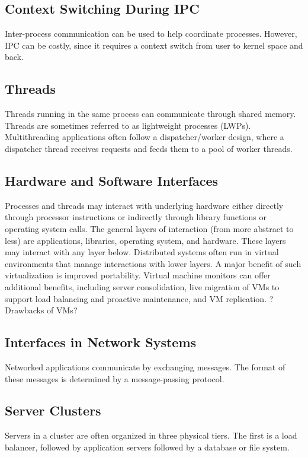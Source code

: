 \documentclass[12pt,titlepage]{article}
\begin{document}
    \subsection{Context Switching During IPC}
      Inter-process communication can be used to help coordinate processes. However, IPC can be costly, since it requires a context switch from user to
      kernel space and back.

    \subsection{Threads}
      Threads running in the same process can communicate through shared memory. Threads are sometimes referred to as lightweight processes (LWPs).
      Multithreading applications often follow a dispatcher/worker design, where a dispatcher thread receives requests and feeds them to a pool
      of worker threads.

    \subsection{Hardware and Software Interfaces}
      Processes and threads may interact with underlying hardware either directly through processor instructions or indirectly through library functions
      or operating system calls. The general layers of interaction (from more abstract to less) are applications, libraries, operating system, and hardware.
      These layers may interact with any layer below. Distributed systems often run in virtual environments that manage interactions with lower layers.
      A major benefit of such virtualization is improved portability. Virtual machine monitors can offer additional benefits, including server consolidation,
      live migration of VMs to support load balancing and proactive maintenance, and VM replication. ?Drawbacks of VMs?

    \subsection{Interfaces in Network Systems}
      Networked applications communicate by exchanging messages. The format of these messages is determined by a message-passing protocol.

    \subsection{Server Clusters}
      Servers in a cluster are often organized in three physical tiers. The first is a load balancer, followed by application servers followed by a database
      or file system.
\end{document}
